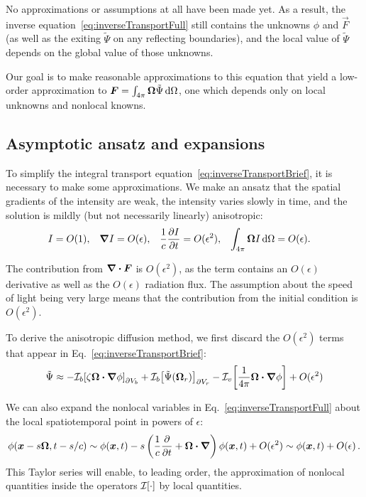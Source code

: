 No approximations or assumptions at all have been made yet. As a
result, the inverse equation~\eqref{eq:inverseTransportFull} still contains
the unknowns $\phi$ and $\vec{F}$ (as well as the exiting $\tilde\Psi$ on
any reflecting boundaries), and the local value of
$\tilde\Psi$ depends on the global value of those unknowns.

Our goal is to make reasonable approximations to this equation that yield a
low-order approximation to $\bm{F}=\int_{4\pi}\bm{\Omega} \tilde\Psi
\mathop{}\!\mathrm{d}\Omega$, one which
depends only on local unknowns and nonlocal knowns.

\subsection{Asymptotic ansatz and expansions}
To simplify the integral transport
equation~\eqref{eq:inverseTransportBrief}, it is necessary to make some
approximations. We make an ansatz that the spatial gradients of the intensity
are weak, the intensity varies slowly in time, and the solution is mildly
(but not necessarily linearly) anisotropic:
\begin{align} \label{eq:ansatz}
  I &= O(1), &
  \bm{\nabla} I &= O(\epsilon), &
  \frac{1}{c}\frac{\partial I}{\partial t} &= O(\epsilon^2), &
  \int_{4\pi} \bm{\Omega} I\mathop{}\!\mathrm{d}\Omega &= O(\epsilon).
\end{align}

The contribution from $\bm{\nabla} \bm{\cdot}\bm{F}$ is $O(\epsilon^2)$, as the term
contains an $O(\epsilon)$ derivative as well as the $O(\epsilon)$ radiation
flux.  The assumption about the speed of light being very large means that the
contribution from the initial condition is $O(\epsilon^2)$.

To derive the anisotropic diffusion method, we first discard the $O(\epsilon^2)$
terms that appear in Eq.~\eqref{eq:inverseTransportBrief}:
\begin{equation} \label{eq:approxPsi1}
  \tilde\Psi \approx 
  -\mathcal{I}_{b}\!\left[\zeta \bm{\Omega}\bm{\cdot} \bm{\nabla} \phi\right]_{\partial V_b}
  + \mathcal{I}_{b}\!\left[\tilde\Psi(\bm{\Omega}_r)\right]_{\partial V_r}
  - \mathcal{I}_{v}\!\left[\frac{1}{4\pi} \bm{\Omega}\bm{\cdot} \bm{\nabla} \phi\right]
  + O(\epsilon^2)
\end{equation}

We can also expand the nonlocal variables in Eq.~\eqref{eq:inverseTransportFull}
about the local spatiotemporal point in powers of $\epsilon$:
\begin{equation} \label{eq:taylorPhi}
  \phi(\bm{x} - s \bm{\Omega}, t-s/c)
  \sim \phi(\bm{x},t) - s \left( \frac{1}{c} \frac{\partial }{\partial t} + \bm{\Omega} \bm{\cdot}
  \bm{\nabla}  \right) \phi (\bm{x}, t) + O(\epsilon^2) \sim \phi(\bm{x},t) +
  O(\epsilon) \,.
\end{equation}
This Taylor series will enable, to leading order, the approximation of nonlocal
quantities inside the operators $\mathcal{I}_{}\!\left[\cdot\right]$ by local quantities.


